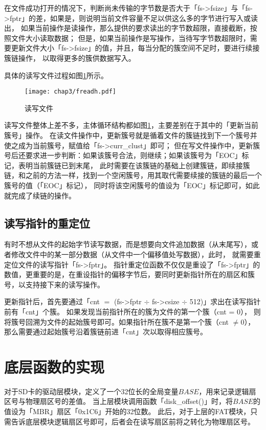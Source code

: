 在文件成功打开的情况下，判断尚未传输的字节数是否大于「fs->fsize」与「fs->fptr」的差，如果是，则说明当前文件容量不足以供这么多的字节进行写入或读出，
如果当前操作是读操作，那么提供的要求读出的字节数超限，直接截断，按照文件大小读取数据；
但是，如果当前操作是写操作，当待写字节数超限时，需要更新文件大小「fs->fsize」的值，并且，每当分配的簇空间不足时，要进行续接簇链操作，
以取得更多的簇供数据写入。

具体的读写文件过程如图\ref{fig:freadflow}所示。
\begin{figure}[!htbp]
    \centering
    \texttt{[image: chap3/freadh.pdf]}
    \\
    \caption{读写文件}\label{fig:freadflow}
\end{figure}
读写文件整体上差不多，主体循环结构都如图\ref{fig:freadflow}，主要差别在于其中的「更新当前簇号」操作。
在读文件操作中，更新簇号就是循着文件的簇链找到下一个簇号并使之成为当前簇号，赋值给「fs->curr\_clust」即可；
但在写文件操作中，更新簇号后还要求进一步判断：如果该簇号合法，则继续；如果该簇号为「EOC」标记，表明当前簇链已到末尾，
此时需要在该簇链的基础上创建簇链，即续接簇链，和之前的方法一样，找到一个空闲簇号，用其取代需要续接的簇链的最后一个簇号的值（「EOC」标记），
同时将该空闲簇号的值设为「EOC」标记即可，如此就完成了续链的操作。

\subsection{读写指针的重定位}
\label{sec:Ptr}
有时不想从文件的起始字节读写数据，而是想要向文件追加数据（从末尾写），或者修改文件中的某一部分数据（从文件中一个偏移值处写数据），此时，
就需要重定位文件的读写指针「fs->fptr」。
指针重定位函数不仅仅是重设了「fs->fptr」的数值，更重要的是，在重设指针的偏移字节后，要同时更新指针所在的扇区和簇号，以支持接下来的读写操作。

更新指针后，首先要通过「cnt $=$ (fs->fptr $\div$ fs->csize $\div$ 512)」求出在读写指针前有「cnt」个簇。
如果发现当前指针所在的簇为文件的第一个簇（cnt = $0$），
则将簇号回溯为文件的起始簇号即可。如果指针所在簇不是第一个簇（cnt $\neq 0$），那么需要通过起始簇号沿着簇链前进「cnt」次以取得相应簇号。

\section{底层函数的实现}
\label{sec:Diskread}
对于SD卡的驱动层模块，定义了一个32位长的全局变量$BASE$，用来记录逻辑扇区号与物理扇区号的差值。
当上层模块调用函数「disk\_offset()」时，将$BASE$的值设为「MBR」扇区「0x1C6」开始的32位数。
此后，对于上层的FAT模块，只需告诉底层模块逻辑扇区号即可，后者会在读写扇区前将之转化为物理扇区号。


